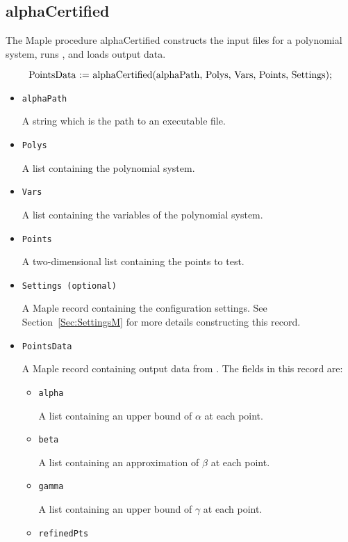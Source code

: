 \documentclass[11pt]{report}
\begin{document}
\subsection{alphaCertified}\label{Sec:alphaM}

The Maple procedure alphaCertified constructs the input files
for a polynomial system, runs \blueharvest, and loads output data.

\[
\hbox{PointsData := alphaCertified(alphaPath, Polys, Vars, Points, Settings);}
\]

\begin{itemize}

\item {\tt alphaPath}

A string which is the path to an \blueharvestS executable file.

\item {\tt Polys}

A list containing the polynomial system.

\item {\tt Vars}

A list containing the variables of the polynomial system.

\item {\tt Points}

A two-dimensional list containing the points to test.

\item {\tt Settings (optional)}

A Maple record containing the configuration settings.
See Section~\ref{Sec:SettingsM} for more details constructing
this record.

\item {\tt PointsData}

A Maple record containing output data from \blueharvest.
The fields in this record are:
\begin{itemize}
 \item {\tt alpha}

A list containing an upper bound of $\alpha$ at each point.

 \item {\tt beta}

A list containing an approximation of $\beta$ at each point.

 \item {\tt gamma}

A list containing an upper bound of $\gamma$ at each point.

 \item {\tt refinedPts}


\end{itemize}
\end{itemize}
\end{document}
